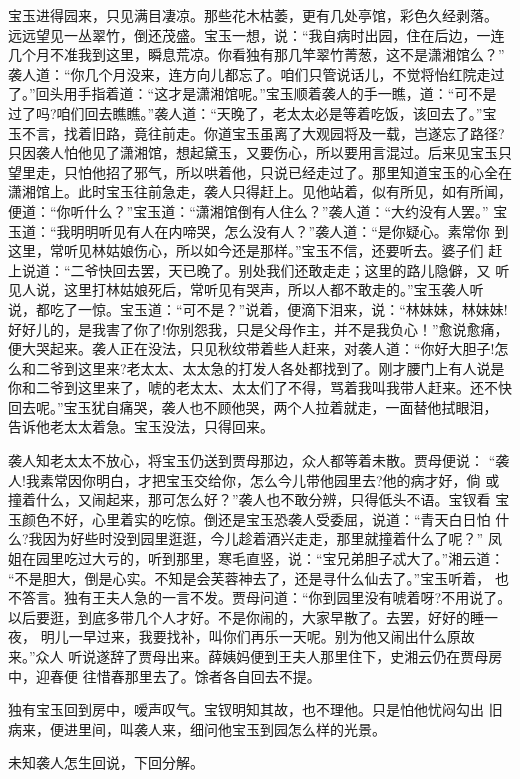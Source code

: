 宝玉进得园来，只见满目凄凉。那些花木枯萎，更有几处亭馆，彩色久经剥落。
远远望见一丛翠竹，倒还茂盛。宝玉一想，说：“我自病时出园，住在后边，一连
几个月不准我到这里，瞬息荒凉。你看独有那几竿翠竹菁葱，这不是潇湘馆么？”
袭人道：“你几个月没来，连方向儿都忘了。咱们只管说话儿，不觉将怡红院走过
了。”回头用手指着道：“这才是潇湘馆呢。”宝玉顺着袭人的手一瞧，道：“可不是
过了吗?咱们回去瞧瞧。”袭人道：“天晚了，老太太必是等着吃饭，该回去了。”宝
玉不言，找着旧路，竟往前走。你道宝玉虽离了大观园将及一载，岂遂忘了路径?
只因袭人怕他见了潇湘馆，想起黛玉，又要伤心，所以要用言混过。后来见宝玉只
望里走，只怕他招了邪气，所以哄着他，只说已经走过了。那里知道宝玉的心全在
潇湘馆上。此时宝玉往前急走，袭人只得赶上。见他站着，似有所见，如有所闻，
便道：“你听什么？”宝玉道：“潇湘馆倒有人住么？”袭人道：“大约没有人罢。”
宝玉道：“我明明听见有人在内啼哭，怎么没有人？”袭人道：“是你疑心。素常你
到这里，常听见林姑娘伤心，所以如今还是那样。”宝玉不信，还要听去。婆子们
赶上说道：“二爷快回去罢，天已晚了。别处我们还敢走走；这里的路儿隐僻，又
听见人说，这里打林姑娘死后，常听见有哭声，所以人都不敢走的。”宝玉袭人听
说，都吃了一惊。宝玉道：“可不是？”说着，便滴下泪来，说：“林妹妹，林妹妹!
好好儿的，是我害了你了!你别怨我，只是父母作主，并不是我负心！”愈说愈痛，
便大哭起来。袭人正在没法，只见秋纹带着些人赶来，对袭人道：“你好大胆子!怎
么和二爷到这里来?老太太、太太急的打发人各处都找到了。刚才腰门上有人说是
你和二爷到这里来了，唬的老太太、太太们了不得，骂着我叫我带人赶来。还不快
回去呢。”宝玉犹自痛哭，袭人也不顾他哭，两个人拉着就走，一面替他拭眼泪，
告诉他老太太着急。宝玉没法，只得回来。

袭人知老太太不放心，将宝玉仍送到贾母那边，众人都等着未散。贾母便说：
“袭人!我素常因你明白，才把宝玉交给你，怎么今儿带他园里去?他的病才好，倘
或撞着什么，又闹起来，那可怎么好？”袭人也不敢分辨，只得低头不语。宝钗看
宝玉颜色不好，心里着实的吃惊。倒还是宝玉恐袭人受委屈，说道：“青天白日怕
什么?我因为好些时没到园里逛逛，今儿趁着酒兴走走，那里就撞着什么了呢？”
凤姐在园里吃过大亏的，听到那里，寒毛直竖，说：“宝兄弟胆子忒大了。”湘云道：
“不是胆大，倒是心实。不知是会芙蓉神去了，还是寻什么仙去了。”宝玉听着，
也不答言。独有王夫人急的一言不发。贾母问道：“你到园里没有唬着呀?不用说了。
以后要逛，到底多带几个人才好。不是你闹的，大家早散了。去罢，好好的睡一夜，
明儿一早过来，我要找补，叫你们再乐一天呢。别为他又闹出什么原故来。”众人
听说遂辞了贾母出来。薛姨妈便到王夫人那里住下，史湘云仍在贾母房中，迎春便
往惜春那里去了。馀者各自回去不提。

独有宝玉回到房中，嗳声叹气。宝钗明知其故，也不理他。只是怕他忧闷勾出
旧病来，便进里间，叫袭人来，细问他宝玉到园怎么样的光景。

未知袭人怎生回说，下回分解。